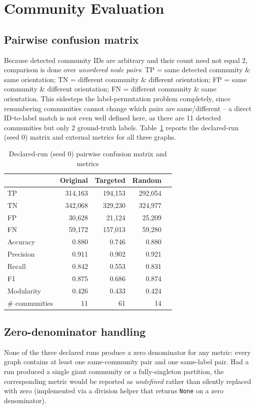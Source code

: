 \documentclass[10pt,twocolumn]{article}
\begin{document}
\section{Community Evaluation}
\label{sec:eval}

\subsection{Pairwise confusion matrix}
Because detected community IDs are arbitrary and their count need not equal 2, comparison is done
over \emph{unordered node pairs}: TP = same detected community \& same orientation; TN = different
community \& different orientation; FP = same community \& different orientation; FN = different
community \& same orientation. This sidesteps the label-permutation problem completely, since
renumbering communities cannot change which pairs are same/different -- a direct ID-to-label match
is not even well defined here, as there are 11 detected communities but only 2 ground-truth labels.
Table~\ref{tab:conf} reports the declared-run (seed 0) matrix and external metrics for all three
graphs.

\begin{table}[h]
\centering
\caption{Declared-run (seed 0) pairwise confusion matrix and metrics}
\label{tab:conf}
\small
\begin{tabular}{@{}lrrrr@{}}
\toprule
 & Original & Targeted & Random \\
\midrule
TP & 314{,}163 & 194{,}153 & 292{,}054 \\
TN & 342{,}068 & 329{,}230 & 324{,}977 \\
FP & 30{,}628 & 21{,}124 & 25{,}209 \\
FN & 59{,}172 & 157{,}013 & 59{,}280 \\
Accuracy & 0.880 & 0.746 & 0.880 \\
Precision & 0.911 & 0.902 & 0.921 \\
Recall & 0.842 & 0.553 & 0.831 \\
F1 & 0.875 & 0.686 & 0.874 \\
Modularity & 0.426 & 0.433 & 0.424 \\
\# communities & 11 & 61 & 14 \\
\bottomrule
\end{tabular}
\end{table}

\subsection{Zero-denominator handling}
None of the three declared runs produce a zero denominator for any metric: every graph contains at
least one same-community pair and one same-label pair. Had a run produced a single giant community
or a fully-singleton partition, the corresponding metric would be reported as \emph{undefined}
rather than silently replaced with zero (implemented via a division helper that returns \texttt{None}
on a zero denominator).
\end{document}
